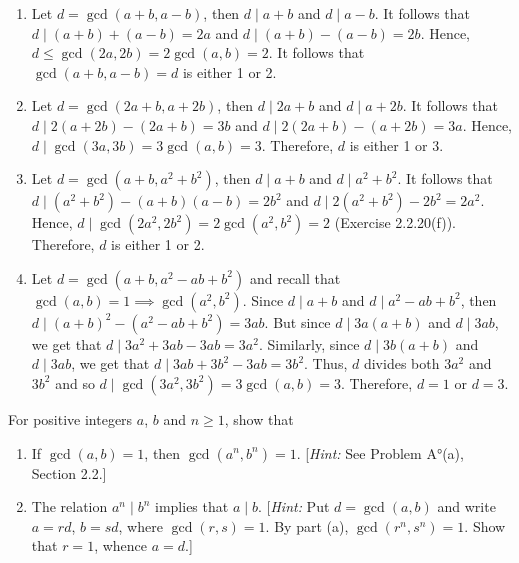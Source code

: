 \begin{solution}
    \begin{enumerate}
        \item Let $d = \gcd(a + b, a - b)$, then $d \mid a + b$ and $d \mid a - b$. It follows that $d \mid (a + b) + (a - b) = 2a$ and $d \mid (a + b) - (a - b) = 2b$. Hence, $d \leq \gcd(2a, 2b) = 2\gcd(a,b) = 2$. It follows that $\gcd(a + b, a - b) = d$ is either 1 or 2.
        \item Let $d = \gcd(2a + b, a + 2b)$, then $d \mid 2a + b$ and $d \mid a + 2b$. It follows that $d \mid 2(a + 2b) - (2a+b) = 3b$ and $d \mid 2(2a + b) - (a + 2b) = 3a$. Hence, $d \mid \gcd(3a, 3b) = 3\gcd(a,b) = 3$. Therefore, $d$ is either 1 or 3.
        \item Let $d = \gcd(a + b, a^2 + b^2)$, then $d \mid a + b$ and $d \mid a^2 + b^2$. It follows that $d \mid (a^2 + b^2) - (a+b)(a-b) = 2b^2$ and $d \mid 2(a^2 + b^2) - 2b^2 = 2a^2$. Hence, $d \mid \gcd(2a^2, 2b^2) = 2\gcd(a^2,b^2) = 2$ (Exercise 2.2.20(f)). Therefore, $d$ is either 1 or 2.
        \item Let $d = \gcd(a+b, a^2 - ab + b^2)$ and recall that $\gcd(a,b) = 1 \implies \gcd(a^2, b^2)$. Since $d \mid a+ b$ and $d \mid a^2 - ab + b^2$, then $d \mid (a+b)^2 - (a^2 - ab + b^2) = 3ab$. But since $d \mid 3a(a+b)$ and $d \mid 3ab$, we get that $d \mid 3a^2 + 3ab - 3ab = 3a^2$. Similarly, since $d \mid 3b(a+b)$ and $d \mid 3ab$, we get that $d \mid 3ab + 3b^2 - 3ab = 3b^2$. Thus, $d$ divides both $3a^2$ and $3b^2$ and so $d \mid \gcd(3a^2, 3b^2) = 3\gcd(a,b) = 3$. Therefore, $d = 1$ or $d = 3$.
    \end{enumerate}
\end{solution}

\begin{exercise}
    For positive integers $a$, $b$ and $n \geq 1$, show that
    \begin{enumerate}
        \item If $\gcd(a,b) = 1$, then $\gcd(a^n, b^n) = 1$. [\textit{Hint:} See Problem A°(a), Section 2.2.]
        \item The relation $a^n \mid b^n$ implies that $a \mid b$. [\textit{Hint:} Put $d = \gcd(a,b)$ and write $a = rd$, $b = sd$, where $\gcd(r,s) = 1$. By part (a), $\gcd(r^n, s^n) = 1$. Show that $r = 1$, whence $a = d$.]
    \end{enumerate}
\end{exercise}

